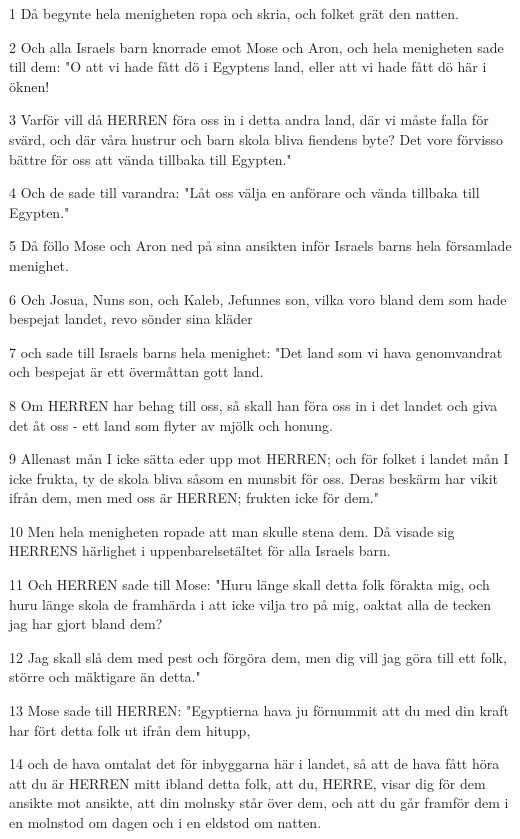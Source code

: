 \par 1 Då begynte hela menigheten ropa och skria, och folket grät den natten.
\par 2 Och alla Israels barn knorrade emot Mose och Aron, och hela menigheten sade till dem: "O att vi hade fått dö i Egyptens land, eller att vi hade fått dö här i öknen!
\par 3 Varför vill då HERREN föra oss in i detta andra land, där vi måste falla för svärd, och där våra hustrur och barn skola bliva fiendens byte? Det vore förvisso bättre för oss att vända tillbaka till Egypten."
\par 4 Och de sade till varandra: "Låt oss välja en anförare och vända tillbaka till Egypten."
\par 5 Då föllo Mose och Aron ned på sina ansikten inför Israels barns hela församlade menighet.
\par 6 Och Josua, Nuns son, och Kaleb, Jefunnes son, vilka voro bland dem som hade bespejat landet, revo sönder sina kläder
\par 7 och sade till Israels barns hela menighet: "Det land som vi hava genomvandrat och bespejat är ett övermåttan gott land.
\par 8 Om HERREN har behag till oss, så skall han föra oss in i det landet och giva det åt oss - ett land som flyter av mjölk och honung.
\par 9 Allenast mån I icke sätta eder upp mot HERREN; och för folket i landet mån I icke frukta, ty de skola bliva såsom en munsbit för oss. Deras beskärm har vikit ifrån dem, men med oss är HERREN; frukten icke för dem."
\par 10 Men hela menigheten ropade att man skulle stena dem. Då visade sig HERRENS härlighet i uppenbarelsetältet för alla Israels barn.
\par 11 Och HERREN sade till Mose: "Huru länge skall detta folk förakta mig, och huru länge skola de framhärda i att icke vilja tro på mig, oaktat alla de tecken jag har gjort bland dem?
\par 12 Jag skall slå dem med pest och förgöra dem, men dig vill jag göra till ett folk, större och mäktigare än detta."
\par 13 Mose sade till HERREN: "Egyptierna hava ju förnummit att du med din kraft har fört detta folk ut ifrån dem hitupp,
\par 14 och de hava omtalat det för inbyggarna här i landet, så att de hava fått höra att du är HERREN mitt ibland detta folk, att du, HERRE, visar dig för dem ansikte mot ansikte, att din molnsky står över dem, och att du går framför dem i en molnstod om dagen och i en eldstod om natten.
